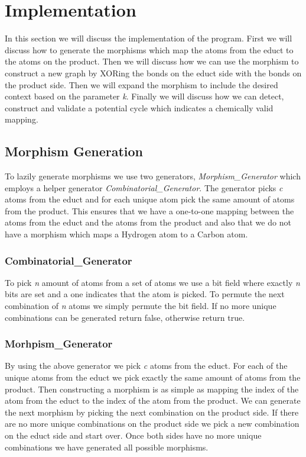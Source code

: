 \documentclass{article}
\begin{document}
\newpage
\section{Implementation}

In this section we will discuss the implementation of the program. First we will discuss how to generate the morphisms which map the atoms from the educt to the atoms on the product. Then we will discuss how we can use the morphism to construct a new graph by XORing the bonds on the educt side with the bonds on the product side. Then we will expand the morphism to include the desired context based on the parameter \textit{k}. Finally we will discuss how we can detect, construct and validate a potential cycle which indicates a chemically valid mapping. 

\subsection{Morphism Generation}

To lazily generate morphisms we use two generators, \textit{Morphism\_Generator} which employs a helper generator \textit{Combinatorial\_Generator}. The generator picks \textit{c} atoms from the educt and for each unique atom pick the same amount of atoms from the product. This ensures that we have a one-to-one mapping between the atoms from the educt and the atoms from the product and also that we do not have a morphism which maps a Hydrogen atom to a Carbon atom.

\subsubsection{Combinatorial\_Generator}

To pick \textit{n} amount of atoms from a set of atoms we use a bit field where exactly \textit{n} bits are set and a one indicates that the atom is picked. To permute the next combination of \textit{n} atoms we simply permute the bit field. If no more unique combinations can be generated return false, otherwise return true.


\subsubsection{Morhpism\_Generator}

By using the above generator we pick \textit{c} atoms from the educt. For each of the unique atoms from the educt we pick exactly the same amount of atoms from the product. Then constructing a morphism is as simple as mapping the index of the atom from the educt to the index of the atom from the product. We can generate the next morphism by picking the next combination on the product side. If there are no more unique combinations on the product side we pick a new combination on the educt side and start over. Once both sides have no more unique combinations we have generated all possible morphisms. 
\end{document}
